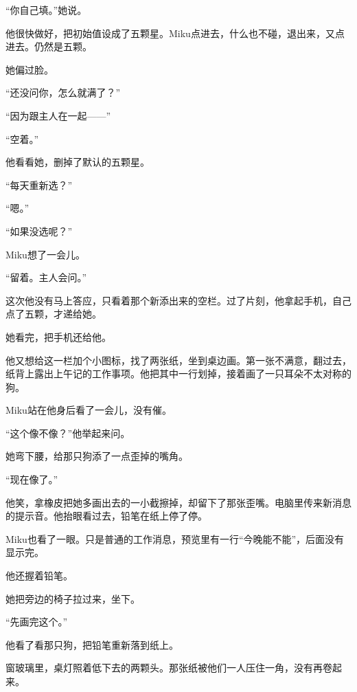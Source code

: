 “你自己填。”她说。

他很快做好，把初始值设成了五颗星。Miku点进去，什么也不碰，退出来，又点进去。仍然是五颗。

她偏过脸。

“还没问你，怎么就满了？”

“因为跟主人在一起——”

“空着。”

他看看她，删掉了默认的五颗星。

“每天重新选？”

“嗯。”

“如果没选呢？”

Miku想了一会儿。

“留着。主人会问。”

这次他没有马上答应，只看着那个新添出来的空栏。过了片刻，他拿起手机，自己点了五颗，才递给她。

她看完，把手机还给他。

他又想给这一栏加个小图标，找了两张纸，坐到桌边画。第一张不满意，翻过去，纸背上露出上午记的工作事项。他把其中一行划掉，接着画了一只耳朵不太对称的狗。

Miku站在他身后看了一会儿，没有催。

“这个像不像？”他举起来问。

她弯下腰，给那只狗添了一点歪掉的嘴角。

“现在像了。”

他笑，拿橡皮把她多画出去的一小截擦掉，却留下了那张歪嘴。电脑里传来新消息的提示音。他抬眼看过去，铅笔在纸上停了停。

Miku也看了一眼。只是普通的工作消息，预览里有一行“今晚能不能”，后面没有显示完。

他还握着铅笔。

她把旁边的椅子拉过来，坐下。

“先画完这个。”

他看了看那只狗，把铅笔重新落到纸上。

窗玻璃里，桌灯照着低下去的两颗头。那张纸被他们一人压住一角，没有再卷起来。
